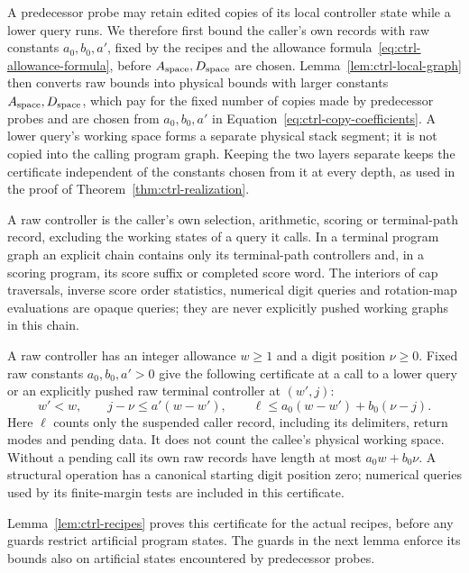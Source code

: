 A predecessor probe may retain edited copies of its local controller
state while a lower query runs.  We therefore first bound the caller's
own records with raw constants $a_0,b_0,a'$, fixed by the recipes and the
allowance formula~\eqref{eq:ctrl-allowance-formula}, before $A_{\rm space},D_{\rm space}$ are chosen.
Lemma~\ref{lem:ctrl-local-graph} then converts raw bounds into physical
bounds with larger constants $A_{\rm space},D_{\rm space}$, which pay for the fixed number of
copies made by predecessor probes and are chosen from $a_0,b_0,a'$ in
Equation~\eqref{eq:ctrl-copy-coefficients}.  A lower query's working space
forms a separate physical stack segment; it is not copied into the
calling program graph.  Keeping the two layers separate keeps the
certificate independent of the constants chosen from it at every depth,
as used in the proof of Theorem~\ref{thm:ctrl-realization}.

\begin{definition}\label{def:ctrl-allowance}
A raw controller is the caller's own selection, arithmetic, scoring or
terminal-path record, excluding the working states of a query it calls.
In a terminal program graph an explicit chain contains only its
terminal-path controllers and, in a scoring program, its score suffix
or completed score word.  The interiors of cap traversals, inverse score
order statistics, numerical digit queries and rotation-map evaluations are opaque queries;
they are never explicitly pushed working graphs in this chain.

A raw controller has an integer allowance $w\ge1$ and a digit position
$\nu\ge0$.  Fixed raw constants $a_0,b_0,a'>0$ give the following
certificate at a call to a lower query or an explicitly pushed raw
terminal controller at $(w',j)$:
\begin{equation}\label{eq:ctrl-local-bound}
 w'<w,\qquad j-\nu\le a'(w-w'),\qquad
 \ell\le a_0(w-w')+b_0(\nu-j).
\end{equation}
Here $\ell$ counts only the suspended caller record, including its
delimiters, return modes and pending data.  It does not count the
callee's physical working space.  Without a pending call its own raw
records have length at most $a_0w+b_0\nu$.  A structural operation has a
canonical starting digit position zero; numerical queries used by its
finite-margin tests are included in this certificate.
\end{definition}

Lemma~\ref{lem:ctrl-recipes} proves this certificate for the actual
recipes, before any guards restrict artificial program states.  The
guards in the next lemma enforce its bounds also on artificial states
encountered by predecessor probes.

